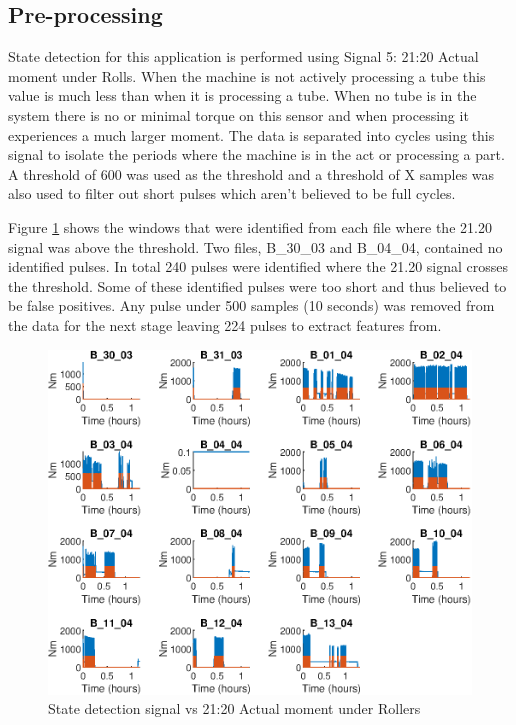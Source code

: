 \documentclass{article}
\begin{document}
\subsection{Pre-processing}
State detection for this application is performed using Signal 5: 21:20 Actual moment under Rolls. When the machine is not actively processing a tube this value is much less than when it is processing a tube. When no tube is in the system there is no or minimal torque on this sensor and when processing it experiences a much larger moment.
The data is separated into cycles using this signal to isolate the periods where the machine is in the act or processing a part. A threshold of 600 was used as the threshold and a threshold of X samples was also used to filter out short pulses which aren't believed to be full cycles.

Figure \ref{fig:StateDetection} shows the windows that were identified from each file where the 21.20 signal was above the threshold. Two files, B\_30\_03 and B\_04\_04, contained no identified pulses. In total 240 pulses were identified where the 21.20 signal crosses the threshold. Some of these identified pulses were too short and thus believed to be false positives. Any pulse under 500 samples (10 seconds) was removed from the data for the next stage leaving 224 pulses to extract features from.

\begin{figure}[H]
    \centering
    \includegraphics[width=\textwidth, height=\textheight, keepaspectratio]{figures/StateDetectionFig.eps}
    \caption{State detection signal vs 21:20 Actual moment under Rollers}
    \label{fig:StateDetection}
\end{figure}
\end{document}
